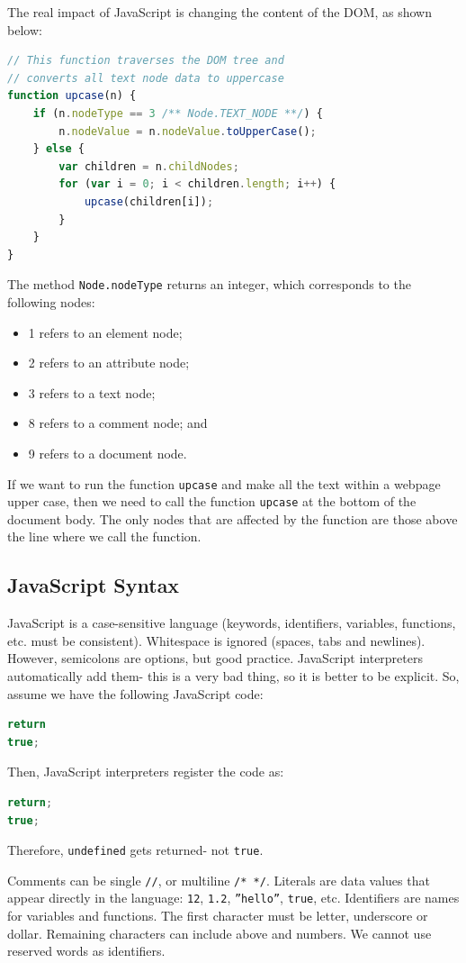\documentclass[a4paper, openany]{memoir}
\begin{document}
The real impact of JavaScript is changing the content of the DOM, as shown below:
\begin{lstlisting}[language=javascript]
// This function traverses the DOM tree and
// converts all text node data to uppercase
function upcase(n) {
    if (n.nodeType == 3 /** Node.TEXT_NODE **/) {
        n.nodeValue = n.nodeValue.toUpperCase();
    } else {
        var children = n.childNodes;
        for (var i = 0; i < children.length; i++) {
            upcase(children[i]);
        }
    }
}
\end{lstlisting}
The method \texttt{Node.nodeType} returns an integer, which corresponds to the following nodes:
\begin{itemize}
    \item 1 refers to an element node;
    \item 2 refers to an attribute node;
    \item 3 refers to a text node;
    \item 8 refers to a comment node; and
    \item 9 refers to a document node.
\end{itemize}

If we want to run the function \texttt{upcase} and make all the text within a webpage upper case, then we need to call the function \texttt{upcase} at the bottom of the document body. The only nodes that are affected by the function are those above the line where we call the function.

\subsection{JavaScript Syntax}
JavaScript is a case-sensitive language (keywords, identifiers, variables, functions, etc. must be consistent). Whitespace is ignored (spaces, tabs and newlines). However, semicolons are options, but good practice. JavaScript interpreters automatically add them- this is a very bad thing, so it is better to be explicit. So, assume we have the following JavaScript code:
\begin{lstlisting}[language=javascript]
return
true;
\end{lstlisting}
Then, JavaScript interpreters register the code as:
\begin{lstlisting}[language=javascript]
return;
true;
\end{lstlisting}
Therefore, \texttt{undefined} gets returned- not \texttt{true}.

Comments can be single \texttt{//}, or multiline \texttt{/* */}. Literals are data values that appear directly in the language: \texttt{12}, \texttt{1.2}, \texttt{''hello''}, \texttt{true}, etc. Identifiers are names for variables and functions. The first character must be letter, underscore or dollar. Remaining characters can include above and numbers. We cannot use reserved words as identifiers. 
\end{document}
